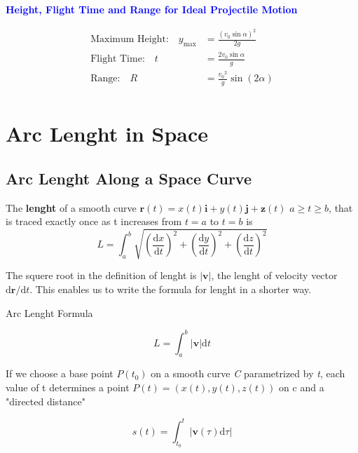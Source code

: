 \documentclass[12pt,a4paper]{article}
\newenvironment{definition}{\begin{definitionbox}}{\end{definitionbox}\vspace{1\baselineskip}}
\newenvironment{ruleBox}[1]{\begin{rulebox}{#1}}{\end{rulebox}\vspace{1\baselineskip}}
\newenvironment{mynote}{\vspace{1\baselineskip}\begin{note}}{\end{note}\vspace{1\baselineskip}}
\begin{document}
\begin{mynote}
  \textcolor{blue}{\textbf{Height, Flight Time and Range for Ideal Projectile Motion}}
  
  \begin{align*}
    \text{Maximum Height:} \quad y_{\text{max}} &= \frac{{(v_0 \sin\alpha)}^2}{2g}\\
    \text{Flight Time:} \quad t &= \frac{2v_0 \sin\alpha}{g}\\
    \text{Range:} \quad R &= \frac{{v_0}^2}{g}\sin(2\alpha)\\
  \end{align*}
\end{mynote}

\newpage

\section{Arc Lenght in Space}

\subsection{Arc Lenght Along a Space Curve}

\begin{definition}
  The \textbf{lenght} of a smooth curve \(\mathbf{r}(t) = x(t)\mathbf{i}+ y(t)\mathbf{j} + \mathbf{z}(t)\) \(a \geq t \geq b\), that is traced exactly once as t increases from \(t=a\) to \(t=b\) is
  \[\mathit{L} = \int_{a}^{b}\sqrt{\left(\frac{\mathrm{d}x}{\mathrm{d}t}\right)^2+\left(\frac{\mathrm{d}y}{\mathrm{d}t}\right)^2+\left(\frac{\mathrm{d}z}{\mathrm{d}t}\right)^2}\]
\end{definition}

The squere root in the definition of lenght is \(|\mathbf{v}|\), the lenght of velocity vector \(\mathrm{d}\mathbf{r}\slash \mathrm{d}t\). This enables us to write the formula for lenght in a shorter way.

\begin{ruleBox}{Arc Lenght Formula}

  \[\mathit{L} = \int_{a}^{b}|\mathbf{v}| \mathrm{d}t\]

\end{ruleBox}


If we choose a base point \(P(t_0)\) on a smooth curve \textit{C} parametrized by \textit{t}, each value of t determines a point \(P(t) = (x(t),y(t),z(t))\) on c and a "directed distance"

\[s(t) = \int_{t_0}^{t}|\mathbf{v}(\tau)\mathrm{d}\tau|\]
\end{document}
